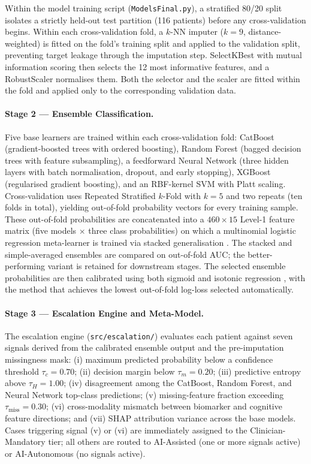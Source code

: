 \documentclass[12pt, a4paper]{report}
\begin{document}
  Within the model training script (\texttt{ModelsFinal.py}), a stratified 80/20
  split isolates a strictly held-out test partition (116 patients) before any
  cross-validation begins. Within each cross-validation fold, a $k$-NN imputer
  ($k=9$, distance-weighted) is fitted on the fold's training split and applied to
  the validation split, preventing target leakage through the imputation step.
  SelectKBest with mutual information scoring then selects the 12 most informative
  features, and a RobustScaler normalises them. Both the selector and the scaler are
  fitted within the fold and applied only to the corresponding validation data.

  \paragraph{Stage 2 — Ensemble Classification.}
  Five base learners are trained within each cross-validation fold: CatBoost
  (gradient-boosted trees with ordered boosting), Random Forest (bagged decision
  trees with feature subsampling), a feedforward Neural Network (three hidden layers
  with batch normalisation, dropout, and early stopping), XGBoost (regularised
  gradient boosting), and an RBF-kernel SVM with Platt scaling. Cross-validation
  uses Repeated Stratified $k$-Fold with $k=5$ and two repeats (ten folds in total),
  yielding out-of-fold probability vectors for every training sample. These
  out-of-fold probabilities are concatenated into a $460 \times 15$ Level-1 feature
  matrix (five models $\times$ three class probabilities) on which a multinomial
  logistic regression meta-learner is trained via stacked generalisation
  \citep{wolpert1992stacked}. The stacked and simple-averaged ensembles are compared
  on out-of-fold AUC; the better-performing variant is retained for downstream stages.
  The selected ensemble probabilities are then calibrated using both sigmoid and
  isotonic regression \citep{platt1999probabilistic}, with the method that achieves
  the lowest out-of-fold log-loss selected automatically.

  \paragraph{Stage 3 — Escalation Engine and Meta-Model.}
  The escalation engine (\texttt{src/escalation/}) evaluates each patient against
  seven signals derived from the calibrated ensemble output and the pre-imputation
  missingness mask: (i) maximum predicted probability below a confidence threshold
  $\tau_c = 0.70$; (ii) decision margin below $\tau_m = 0.20$; (iii) predictive
  entropy above $\tau_H = 1.00$; (iv) disagreement among the CatBoost, Random Forest,
  and Neural Network top-class predictions; (v) missing-feature fraction exceeding
  $\tau_\text{miss} = 0.30$; (vi) cross-modality mismatch between biomarker and
  cognitive feature directions; and (vii) SHAP attribution variance across the base
  models. Cases triggering signal (v) or (vi) are immediately assigned to the
  Clinician-Mandatory tier; all others are routed to AI-Assisted (one or more signals
  active) or AI-Autonomous (no signals active).
\end{document}
